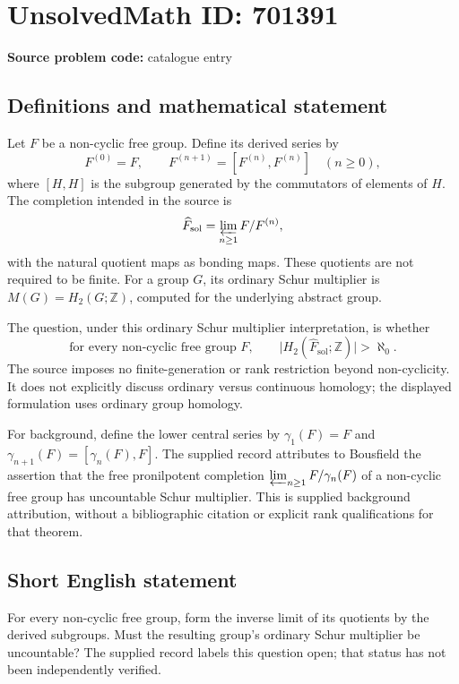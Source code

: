 \documentclass[11pt]{article}
\newcommand{\Z}{\mathbb{Z}}
\begin{document}
\section*{UnsolvedMath ID: 701391}
\textbf{Source problem code:} catalogue entry
\subsection{Definitions and mathematical statement}
Let \(F\) be a non-cyclic free group. Define its derived series by
\[
F^{(0)}=F,\qquad F^{(n+1)}=[F^{(n)},F^{(n)}]\quad(n\geq 0),
\]
where \([H,H]\) is the subgroup generated by the commutators of elements of \(H\). The completion intended in the source is
\[
\widehat F_{\mathrm{sol}}=\varprojlim_{n\geq 1} F/F^{(n)},
\]
with the natural quotient maps as bonding maps. These quotients are not required to be finite. For a group \(G\), its ordinary Schur multiplier is \(M(G)=H_2(G;\Z)\), computed for the underlying abstract group.

The question, under this ordinary Schur multiplier interpretation, is whether
\[
\text{for every non-cyclic free group }F,\qquad
\bigl|H_2(\widehat F_{\mathrm{sol}};\Z)\bigr|>\aleph_0.
\]
The source imposes no finite-generation or rank restriction beyond non-cyclicity. It does not explicitly discuss ordinary versus continuous homology; the displayed formulation uses ordinary group homology.

For background, define the lower central series by \(\gamma_1(F)=F\) and \(\gamma_{n+1}(F)=[\gamma_n(F),F]\). The supplied record attributes to Bousfield the assertion that the free pronilpotent completion \(\varprojlim_{n\geq 1}F/\gamma_n(F)\) of a non-cyclic free group has uncountable Schur multiplier. This is supplied background attribution, without a bibliographic citation or explicit rank qualifications for that theorem.
\subsection{Short English statement}
For every non-cyclic free group, form the inverse limit of its quotients by the derived subgroups. Must the resulting group's ordinary Schur multiplier be uncountable? The supplied record labels this question open; that status has not been independently verified.
\end{document}
